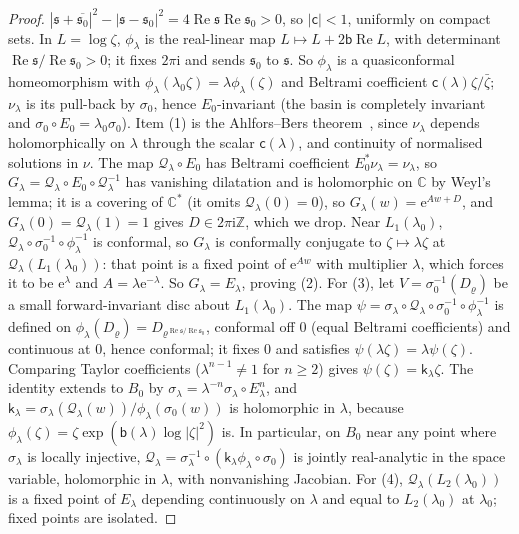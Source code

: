 \documentclass[11pt]{amsart}
\theoremstyle{definition}
\newcommand{\eee}{\mathrm{e}}
\newcommand{\ii}{\mathrm{i}}
\begin{document}
\begin{proof}
$|\mathfrak s+\overline{\mathfrak s_0}|^2-|\mathfrak s-\mathfrak s_0|^2=4\operatorname{Re}\mathfrak s\operatorname{Re}\mathfrak s_0>0$, so $|\mathsf c|<1$, uniformly on compact
sets.  In $L=\log\zeta$, $\phi_\lambda$ is the real-linear map $L\mapsto L+2\mathsf b\operatorname{Re}L$, with
determinant $\operatorname{Re}\mathfrak s/\operatorname{Re}\mathfrak s_0>0$; it fixes $2\pi\ii$ and sends $\mathfrak s_0$ to $\mathfrak s$.  So $\phi_\lambda$ is a
quasiconformal homeomorphism with $\phi_\lambda(\lambda_0\zeta)=\lambda\phi_\lambda(\zeta)$ and Beltrami
coefficient $\mathsf c(\lambda)\zeta/\bar\zeta$; $\nu_\lambda$ is its pull-back by $\sigma_0$, hence
$E_0$-invariant (the basin is completely invariant and $\sigma_0\circ E_0=\lambda_0\sigma_0$).
Item (1) is the Ahlfors--Bers theorem~\cite[Thm.~11]{AhlforsBers1960}, since
$\nu_\lambda$ depends holomorphically on $\lambda$ through the scalar $\mathsf c(\lambda)$, and
continuity of normalised solutions in $\nu$.  The map $\mathcal Q_\lambda\circ E_0$ has Beltrami coefficient $E_0^*\nu_\lambda=\nu_\lambda$, so
$G_\lambda=\mathcal Q_\lambda\circ E_0\circ \mathcal Q_\lambda^{-1}$ has vanishing dilatation and is holomorphic on $\mathbb C$
by Weyl's lemma; it is a covering of $\mathbb C^*$ (it omits $\mathcal Q_\lambda(0)=0$), so
$G_\lambda(w)=\eee^{A w+D}$, and $G_\lambda(0)=\mathcal Q_\lambda(1)=1$ gives $D\in2\pi\ii\mathbb Z$, which we drop.  Near $L_1(\lambda_0)$, $\mathcal Q_\lambda\circ\sigma_0^{-1}\circ\phi_\lambda^{-1}$ is conformal, so $G_\lambda$ is
conformally conjugate to $\zeta\mapsto\lambda\zeta$ at $\mathcal Q_\lambda(L_1(\lambda_0))$: that point is a
fixed point of $\eee^{Aw}$ with multiplier $\lambda$, which forces it to be $\eee^\lambda$ and
$A=\lambda\eee^{-\lambda}$.  So $G_\lambda=E_\lambda$, proving (2).  For (3), let $V=\sigma_0^{-1}(D_\varrho)$ be a small forward-invariant disc about
$L_1(\lambda_0)$.  The map $\psi=\sigma_\lambda\circ \mathcal Q_\lambda\circ\sigma_0^{-1}\circ\phi_\lambda^{-1}$ is defined on
$\phi_\lambda(D_\varrho)=D_{\varrho^{\operatorname{Re}\mathfrak s/\operatorname{Re}\mathfrak s_0}}$, conformal off $0$ (equal Beltrami
coefficients) and continuous at $0$, hence conformal; it fixes $0$ and
satisfies $\psi(\lambda\zeta)=\lambda\psi(\zeta)$.  Comparing Taylor coefficients ($\lambda^{n-1}\ne1$
for $n\ge2$) gives $\psi(\zeta)=\mathsf k_\lambda\zeta$.  The identity extends to $B_0$ by
$\sigma_\lambda=\lambda^{-n}\sigma_\lambda\circ E_\lambda^n$, and
$\mathsf k_\lambda=\sigma_\lambda(\mathcal Q_\lambda(w))/\phi_\lambda(\sigma_0(w))$ is holomorphic in $\lambda$, because
$\phi_\lambda(\zeta)=\zeta\exp(\mathsf b(\lambda)\log|\zeta|^2)$ is.  In particular, on $B_0$ near any point
where $\sigma_\lambda$ is locally injective,
$\mathcal Q_\lambda=\sigma_\lambda^{-1}\circ(\mathsf k_\lambda\phi_\lambda\circ\sigma_0)$ is jointly real-analytic in the space
variable, holomorphic in $\lambda$, with nonvanishing Jacobian.  For (4),
$\mathcal Q_\lambda(L_2(\lambda_0))$ is a fixed point of $E_\lambda$ depending continuously on $\lambda$ and equal
to $L_2(\lambda_0)$ at $\lambda_0$; fixed points are isolated.
\end{proof}
\end{document}
